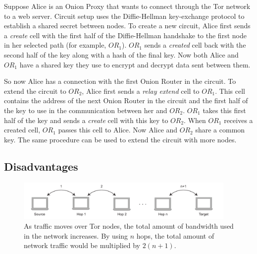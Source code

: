 \documentclass{article}
\begin{document}
		
		
		Suppose Alice is an Onion Proxy that wants to connect through the Tor network to a web server. Circuit setup uses the Diffie-Hellman key-exchange protocol \cite{diffiehellman} to establish a shared secret between nodes. To create a new circuit, Alice first sends a \emph{create} cell with the first half of the Diffie-Hellman handshake to the first node in her selected path (for example, $ OR_1 $). $ OR_1 $ sends a \emph{created} cell back with the second half of the key along with a hash of the final key. Now both Alice and $ OR_1 $ have a shared key they use to encrypt and decrypt data sent between them.
		
		So now Alice has a connection with the first Onion Router in the circuit. To extend the circuit to $ OR_2 $, Alice first sends a \emph{relay extend} cell to $ OR_1 $. This cell contains the address of the next Onion Router in the circuit and the first half of the key to use in the communication between her and $ OR_2 $. $ OR_1 $ takes this first half of the key and sends a \emph{create} cell with this key to $ OR_2 $. When $ OR_1 $ receives a created cell, $ OR_1 $ passes this cell to Alice. Now Alice and $ OR_2 $ share a common key. The same procedure can be used to extend the circuit with more nodes.
			
	\subsection{Disadvantages}
		\label{ss:tor_disadvantages}
		
		\begin{figure}[!t]
			\centering
			\includegraphics[width=0.95\textwidth]{graphics/hops.pdf}
			\caption{As traffic moves over Tor nodes, the total amount of bandwidth used in the network increases. By using $n$ hops, the total amount of network traffic would be multiplied by $2(n+1)$.}
			\label{fig:hops}
		\end{figure}
\end{document}
